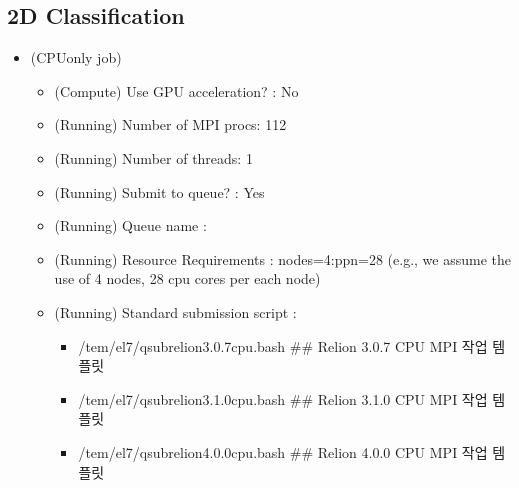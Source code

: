\documentclass[a4paper,11pt,english]{sphinxmanual}
\begin{document}



\subsection{2D Classification}
\label{\detokenize{relion:d-classification}}\begin{itemize}
\item {} 
\sphinxAtStartPar
{} (CPU\sphinxhyphen{}only job)
\begin{itemize}
\item {} 
\sphinxAtStartPar
(Compute) Use GPU acceleration? : No

\item {} 
\sphinxAtStartPar
(Running) Number of MPI procs: 112

\item {} 
\sphinxAtStartPar
(Running) Number of threads: 1

\item {} 
\sphinxAtStartPar
(Running) Submit to queue? : Yes

\item {} 
\sphinxAtStartPar
(Running) Queue name : 

\item {} 
\sphinxAtStartPar
(Running) Resource Requirements : nodes=4:ppn=28  (e.g., we assume the use of 4 nodes, 28 cpu cores per each node)

\item {} 
\sphinxAtStartPar
(Running) Standard submission script :
\begin{itemize}
\item {} 
\sphinxAtStartPar
/tem/el7/qsub\sphinxhyphen{}relion\sphinxhyphen{}3.0.7\sphinxhyphen{}cpu.bash           \#\# Relion 3.0.7 CPU MPI 작업 템플릿

\item {} 
\sphinxAtStartPar
/tem/el7/qsub\sphinxhyphen{}relion\sphinxhyphen{}3.1.0\sphinxhyphen{}cpu.bash           \#\# Relion 3.1.0 CPU MPI 작업 템플릿

\item {} 
\sphinxAtStartPar
/tem/el7/qsub\sphinxhyphen{}relion\sphinxhyphen{}4.0.0\sphinxhyphen{}cpu.bash           \#\# Relion 4.0.0 CPU MPI 작업 템플릿

\end{itemize}

\end{itemize}

\end{itemize}
\end{document}
